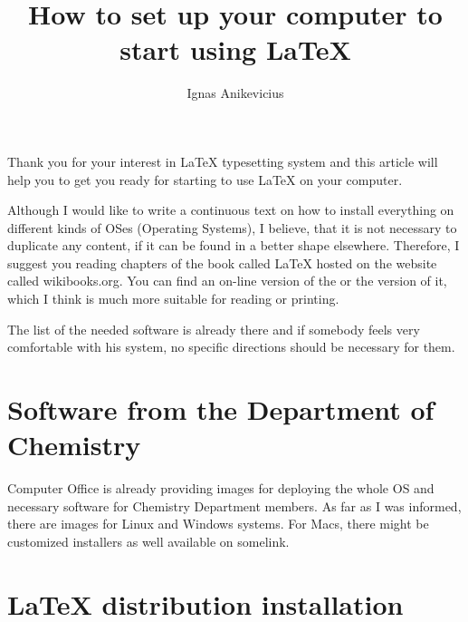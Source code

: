 \documentclass[
    draft
]{scrartcl}
\title{How to set up your computer to start using \LaTeX{}}
\author{Ignas Anikevicius}
\begin{document}
\maketitle
\tableofcontents
\listoftodos

%
Thank you for your interest in \LaTeX{} typesetting system and this article
    will help you to get you ready for starting to use \LaTeX{} on your
    computer.

%
Although I would like to write a continuous text on how to install
    everything on different kinds of OSes (Operating Systems), I believe, that
    it is not necessary to duplicate any content, if it can be found in a better
    shape elsewhere. 
%
Therefore, I suggest you reading chapters of the book called \LaTeX{} hosted on
    the website called wikibooks.org. 
%
You can find an on-line version of the
     or the
    version of it, which I think is much more suitable for reading or printing.

%
The list of the needed software is already there and if somebody feels very
    comfortable with his system, no specific directions should be necessary for
    them.

\section{Software from the Department of Chemistry}

%
Computer Office is already providing images for deploying the whole OS and
    necessary software for Chemistry Department members. 
%
As far as I was informed, there are images for Linux and Windows systems.
%
For Macs, there might be customized installers as well available on
    somelink.

\section{\LaTeX{} distribution installation}
\end{document}

